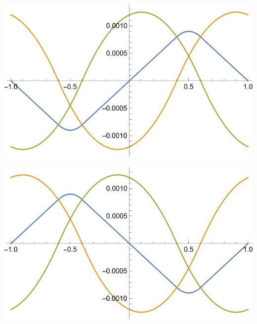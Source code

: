 \documentclass[10pt]{article}
\begin{document}
\begin{center}
    \begin{minipage}{0.49\linewidth}
        \includegraphics[width=\textwidth]{IMG/3-0.4.png}
    \end{minipage}
    \hfill
    \begin{minipage}{0.49\linewidth}
        \includegraphics[width=\textwidth]{IMG/3-0.6.png}
    \end{minipage}
\end{center}
\end{document}
